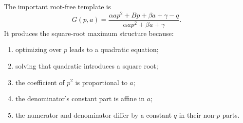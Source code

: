 \documentclass[11pt]{article}
\begin{document}
The important root-free template is
\[
\boxed{
G(p,a)
=
\frac{\alpha a p^2+Bp+\beta a+\gamma-q}
{\alpha a p^2+\beta a+\gamma}.
}
\]
It produces the square-root maximum structure because:
\begin{enumerate}
    \item optimizing over \(p\) leads to a quadratic equation;
    \item solving that quadratic introduces a square root;
    \item the coefficient of \(p^2\) is proportional to \(a\);
    \item the denominator's constant part is affine in \(a\);
    \item the numerator and denominator differ by a constant \(q\) in their non-\(p\) parts.
\end{enumerate}
\end{document}
